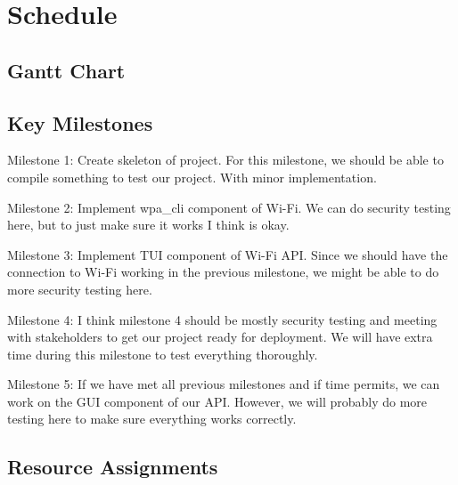 \section{Schedule}

\subsection{Gantt Chart}

\subsection{Key Milestones}

Milestone 1: Create skeleton of project. For this milestone, we should be able to compile something to test our project. With minor implementation. 

Milestone 2: Implement wpa_cli component of Wi-Fi. We can do security testing here, but to just make sure it works I think is okay. 

Milestone 3: Implement TUI component of Wi-Fi API. Since we should have the connection to Wi-Fi working in the previous milestone, we might be able 
to do more security testing here. 

Milestone 4: I think milestone 4 should be mostly security testing and meeting with stakeholders to get our project ready for deployment. We will have 
extra time during this milestone to test everything thoroughly. 

Milestone 5: If we have met all previous milestones and if time permits, we can work on the GUI component of our API. However, we will probably do more 
testing here to make sure everything works correctly. 

\subsection{Resource Assignments}
%

